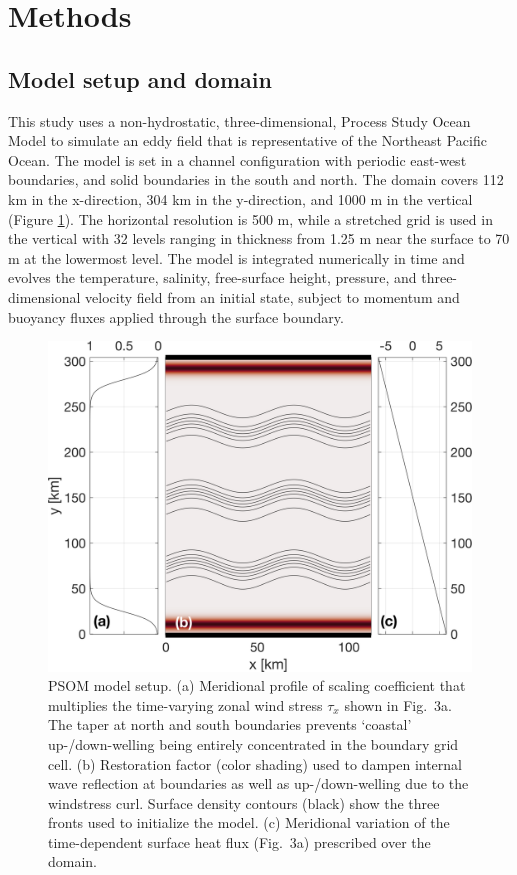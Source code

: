 \documentclass[article,linenumbers]{agujournal2018}
\begin{document}
	\section{Methods}
	\label{sec: Methods}
	\subsection{Model setup and domain}
	
	This study uses a non-hydrostatic, three-dimensional, Process Study Ocean Model \citep[PSOM;][]{Mahadevan_1996a,Mahadevan_1996b} to simulate an eddy field that is representative of the Northeast Pacific Ocean. The model is set in a channel configuration with periodic east-west boundaries, and solid boundaries in the south and north. The domain covers 112 km in the x-direction, 304 km in the y-direction, and 1000 m in the vertical (Figure \ref{fig: model_domain}). The horizontal resolution is 500 m, while a stretched grid is used in the vertical with 32 levels ranging in thickness from 1.25 m near the surface to 70 m at the lowermost level. The model is integrated numerically in time and evolves the temperature, salinity, free-surface height, pressure, and three-dimensional velocity field from an initial state, subject to momentum and buoyancy fluxes applied through the surface boundary.
	
	\begin{figure}[ht]
		\centering
		\includegraphics[width = .6\linewidth]{Fig1_model_domain}
		\caption{PSOM model setup. (a) Meridional profile of scaling coefficient that multiplies the time-varying zonal wind stress $\tau_x$ shown in Fig.~3a. The taper at north and south boundaries prevents `coastal' up-/down-welling being entirely concentrated in the boundary grid cell. (b) Restoration factor (color shading) used to dampen internal wave reflection at boundaries as well as up-/down-welling due to the windstress curl. Surface density contours (black) show the three fronts used to initialize the model. (c) Meridional variation of the time-dependent surface  heat flux (Fig.~3a) prescribed over the domain.}
		\label{fig: model_domain}
	\end{figure}
	
\end{document}
